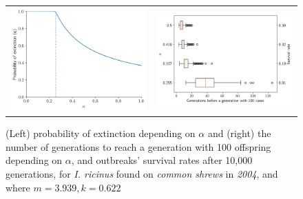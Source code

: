 \documentclass[hidelinks]{article}
\begin{document}
\begin{figure}[]
	\begin{mdframed}[backgroundcolor=grey250,rightline=false,leftline=false,topline=false]
		\centering
		\begin{tabular}{ll}
			\includegraphics[width=.46\linewidth,valign=m]{extinctionProbability2004_I. ricinus_SA} & \includegraphics[width=.50\linewidth,valign=m]{firstGeneration100_2004_I. ricinus_SA}
		\end{tabular}
		\caption{(Left) probability of extinction depending on $ \alpha $ and (right) the number of generations to reach a generation with 100 offspring depending on $ \alpha $, and  outbreaks' survival rates after 10,000 generations, for \textit{I. ricinus} found on \textit{common shrews} in \textit{2004}, and where $ m = 3.939, k = 0.622 $ }
		\label{fig:simulation_2004_iricinus_SA}
	\end{mdframed}
\end{figure}
\end{document}
